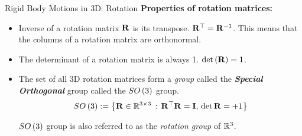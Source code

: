 \documentclass[aspectratio=169]{beamer}
\begin{document}
\begin{frame}{Rigid Body Motions in 3D: Rotation}
  \textbf{Properties of rotation matrices:}
  \begin{itemize}
    \item Inverse of a rotation matrix $\mathbf{R}$ is its transpose. $\mathbf{R}^\top = \mathbf{R}^{-1}$. This means that the columns of a rotation matrix are orthonormal.
    \item The determinant of a rotation matrix is always 1. $\det\left( \mathbf{R} \right) = 1$.
    \item The set of all 3D rotation matrices form a \textit{group} called the \textbf{\textit{Special Orthogonal}} group called the $SO\left( 3\right)$ group.
    \[ SO\left( 3 \right) := \left\{ \mathbf{R} \in \mathbb{R}^{3 \times 3} \, : \, \mathbf{R}^\top\mathbf{R} = \mathbf{I}, \, \det \mathbf{R} = +1 \right\}  \]

    $SO\left( 3 \right)$ group is also referred to as the \textit{rotation group} of $\mathbb{R}^3$.
  \end{itemize}
\end{frame}
\end{document}
